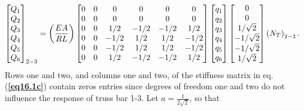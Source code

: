 \documentclass{AeroStructure-ERJohnson}
\begin{document}
\begin{example}
\begin{align}
\left[\begin{array}{@{}l@{}}Q_{1} \\Q_{2} \\Q_{3} \\Q_{4} \\Q_{5} \\Q_{6}\end{array}\right]_{2-3} = \left(\frac{EA}{RL}\right)\left[\begin{array}{@{}cccccc@{}}0 & 0 & 0 & 0 & 0 & 0 \\0 & 0 & 0 & 0 & 0 & 0 \\0 & 0 & 1 / 2 & -1 / 2 & -1 / 2 & 1 / 2 \\0 & 0 & -1 / 2 & 1 / 2 & 1 / 2 & -1 / 2 \\0 & 0 & -1 / 2 & 1 / 2 & 1 / 2 & -1 / 2 \\0 & 0 & 1 / 2 & -1 / 2 & -1 / 2 & 1 / 2\end{array}\right]\left[\begin{array}{@{}c@{}}q_{1} \\q_{2} \\q_{3} \\q_{4} \\q_{5} \\q_{6}\end{array}\right]\left[\begin{array}{@{}c@{}}0 \\0 \\1 / \sqrt{2} \\-1 / \sqrt{2} \\-1 / \sqrt{2} \\1 / \sqrt{2}\end{array}\right]\left(N_{T}\right)_{2-3}.
\end{align}
Rows one and two, and columns one and two, of the stiffness matrix in eq. (\textbf{\ref{eq16.1c}}) contain zeros entries since degrees of freedom one and two do not influence the response of truss bar 1-3. Let $a=\frac{1}{2 \sqrt{2}}$, so that
\begin{align}\label{eq16.1d}\tag{d}

\end{align}
\end{example}
\end{document}
